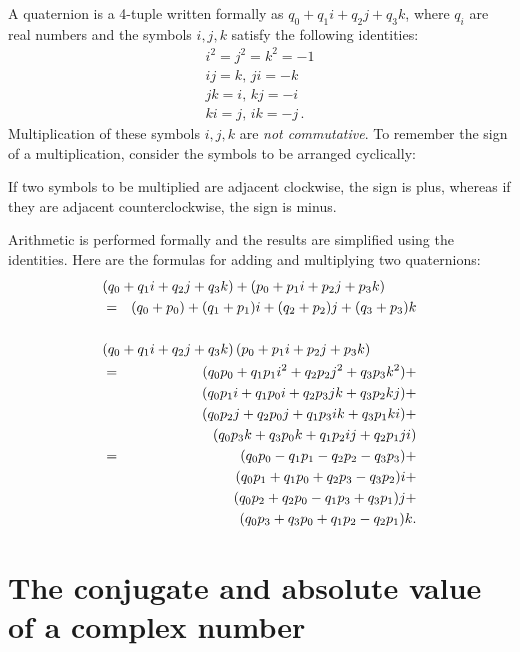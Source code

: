 \documentclass[11pt,a4paper]{report}
\begin{document}
A quaternion is a 4-tuple written formally as $q_0+q_1i+q_2j+q_3k$,
where $q_i$ are real numbers and the symbols $i,j,k$ satisfy the
following identities:
\begin{displaymath}
\begin{array}{l}
i^2=j^2=k^2=-1\\
ij=k,\,ji=-k\\
jk=i,\,kj=-i\\
ki=j,\,ik=-j\,.
\end{array}
\end{displaymath}
Multiplication of these symbols $i,j,k$ are \emph{not commutative}. To remember the sign of a multiplication, consider the symbols to be arranged cyclically:
\begin{center}
\end{center}
If two symbols to be multiplied are adjacent clockwise, the sign is plus, whereas if they are adjacent counterclockwise, the sign is minus.

Arithmetic is performed formally and the results are simplified using the identities. Here are the formulas for adding and multiplying two quaternions:
\begin{eqnarray*}
\lefteqn{(q_0+q_1i+q_2j+q_3k)+(p_0+p_1i+p_2j+p_3k)}\\
&=& (q_0+p_0) + (q_1+p_1)i + (q_2+p_2)j + (q_3+p_3)k\\
%
&\rule{0pt}{2pt}&\\
%
\lefteqn{(q_0+q_1i+q_2j+q_3k)\, (p_0+p_1i+p_2j+p_3k)}\\
&=& (q_0p_0 + q_1p_1i^2 + q_2p_2j^2+q_3p_3k^2) +\\
&& (q_0p_1i + q_1p_0i + q_2p_3jk + q_3p_2kj) +\\
&& (q_0p_2j + q_2p_0j + q_1p_3ik + q_3p_1ki) +\\
&& (q_0p_3k + q_3p_0k + q_1p_2ij + q_2p_1ji)\\
&=& (q_0p_0 - q_1p_1 - q_2p_2 - q_3p_3) +\\
&& (q_0p_1 + q_1p_0 + q_2p_3 - q_3p_2)i +\\
&& (q_0p_2 + q_2p_0 - q_1p_3 + q_3p_1)j +\\
&& (q_0p_3 + q_3p_0 + q_1p_2 - q_2p_1)k.
\end{eqnarray*}

\section{The conjugate and absolute value of a complex number}
\end{document}
